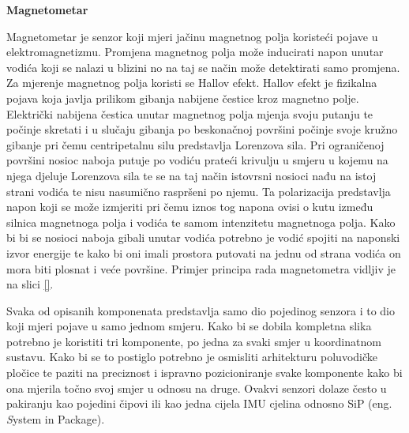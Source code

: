 \documentclass[times, utf8, diplomski]{fer}
\begin{document}
\textbf{Magnetometar}

Magnetometar je senzor koji mjeri jačinu magnetnog polja koristeći pojave u elektromagnetizmu. Promjena magnetnog polja može
inducirati napon unutar vodića koji se nalazi u blizini no na taj se način može detektirati samo promjena. Za mjerenje magnetnog
polja koristi se Hallov efekt. Hallov efekt je fizikalna pojava koja javlja prilikom gibanja nabijene čestice kroz magnetno polje.
Električki nabijena čestica unutar magnetnog polja mjenja svoju putanju te počinje skretati i u slučaju gibanja po beskonačnoj
površini počinje svoje kružno gibanje pri čemu centripetalnu silu predstavlja Lorenzova sila. Pri ograničenoj površini nosioc
naboja putuje po vodiću prateći krivulju u smjeru u kojemu na njega djeluje Lorenzova sila te se na taj način istovrsni nosioci
nađu na istoj strani vodića te nisu nasumično raspršeni po njemu. Ta polarizacija predstavlja napon koji se može izmjeriti pri
čemu iznos tog napona ovisi o kutu između silnica magnetnoga polja i vodića te samom intenzitetu magnetnoga polja. Kako bi bi se 
nosioci naboja gibali unutar vodića potrebno je vodić spojiti na naponski izvor energije te kako bi oni imali prostora putovati na 
jednu od strana vodića on mora biti plosnat i veće površine. Primjer principa rada magnetometra vidljiv je na slici \ref{}.


Svaka od opisanih komponenata predstavlja samo dio pojedinog senzora i to dio koji mjeri pojave u samo jednom smjeru. Kako bi se
dobila kompletna slika potrebno je koristiti tri komponente, po jedna za svaki smjer u koordinatnom sustavu. Kako bi se to postiglo
potrebno je osmisliti arhitekturu poluvodičke pločice te paziti na preciznost i ispravno pozicioniranje svake komponente kako bi
ona mjerila točno svoj smjer u odnosu na druge. Ovakvi senzori dolaze često u pakiranju kao pojedini čipovi ili kao jedna cijela
IMU cjelina odnosno SiP (eng. \textit System in Package).
\end{document}
